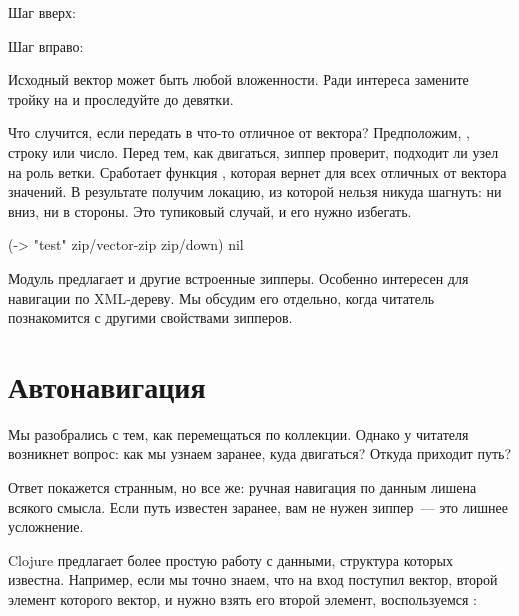 Шаг вверх:

\begin{figure}[H]
  \centering
  
  \label{fig:chart-zip-10}
\end{figure}

Шаг вправо:

\begin{figure}[H]
  \centering
  
  \label{fig:chart-zip-11}
\end{figure}

Исходный вектор может быть любой вложенности. Ради интереса замените тройку на
 и проследуйте до девятки.

Что случится, если передать в  что-то отличное от вектора?
Предположим, , строку или число. Перед тем, как двигаться, зиппер проверит,
подходит ли узел на роль ветки. Сработает функция , которая вернет
 для всех отличных от вектора значений. В результате получим локацию, из
которой нельзя никуда шагнуть: ни вниз, ни в стороны. Это тупиковый случай, и
его нужно избегать.

\begin{english}
  \begin{clojure}
(-> "test"
    zip/vector-zip
    zip/down)
nil
  \end{clojure}
\end{english}

Модуль  предлагает и другие встроенные зипперы. Особенно интересен
 для навигации по XML-дереву. Мы обсудим его отдельно, когда читатель
познакомится с другими свойствами зипперов.

\section{Автонавигация}

Мы разобрались с тем, как перемещаться по коллекции. Однако у читателя возникнет
вопрос: как мы узнаем заранее, куда двигаться? Откуда приходит путь?

Ответ покажется странным, но все же: ручная навигация по данным лишена всякого
смысла. Если путь известен заранее, вам не нужен зиппер~--- это лишнее
усложнение.

Clojure предлагает более простую работу с данными, структура которых
известна. Например, если мы точно знаем, что на вход поступил вектор, второй
элемент которого вектор, и нужно взять его второй элемент, воспользуемся
:

